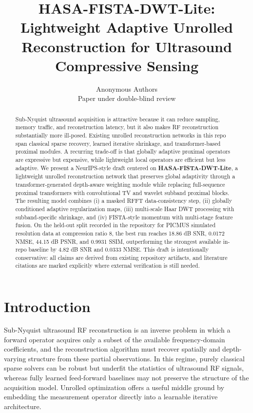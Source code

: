 \documentclass{article}
\title{HASA-FISTA-DWT-Lite: Lightweight Adaptive Unrolled Reconstruction for Ultrasound Compressive Sensing}
\author{
  Anonymous Authors \\
  Paper under double-blind review
}
\begin{document}
\maketitle

\begin{abstract}
Sub-Nyquist ultrasound acquisition is attractive because it can reduce sampling, memory traffic, and reconstruction latency, but it also makes RF reconstruction substantially more ill-posed. Existing unrolled reconstruction networks in this repo span classical sparse recovery, learned iterative shrinkage, and transformer-based proximal modules. A recurring trade-off is that globally adaptive proximal operators are expressive but expensive, while lightweight local operators are efficient but less adaptive. We present a NeurIPS-style draft centered on \textbf{HASA-FISTA-DWT-Lite}, a lightweight unrolled reconstruction network that preserves global adaptivity through a transformer-generated depth-aware weighting module while replacing full-sequence proximal transformers with convolutional TV and wavelet subband proximal blocks. The resulting model combines (i) a masked RFFT data-consistency step, (ii) globally conditioned adaptive regularization maps, (iii) multi-scale Haar DWT processing with subband-specific shrinkage, and (iv) FISTA-style momentum with multi-stage feature fusion. On the held-out split recorded in the repository for PICMUS simulated resolution data at compression ratio 8, the best run reaches 18.86 dB SNR, 0.0172 NMSE, 44.15 dB PSNR, and 0.9931 SSIM, outperforming the strongest available in-repo baseline by 4.82 dB SNR and 0.0333 NMSE. This draft is intentionally conservative: all claims are derived from existing repository artifacts, and literature citations are marked explicitly where external verification is still needed.
\end{abstract}

\section{Introduction}
Sub-Nyquist ultrasound RF reconstruction is an inverse problem in which a forward operator acquires only a subset of the available frequency-domain coefficients, and the reconstruction algorithm must recover spatially and depth-varying structure from these partial observations. In this regime, purely classical sparse solvers can be robust but underfit the statistics of ultrasound RF signals, whereas fully learned feed-forward baselines may not preserve the structure of the acquisition model. Unrolled optimization offers a useful middle ground by embedding the measurement operator directly into a learnable iterative architecture.
\end{document}
